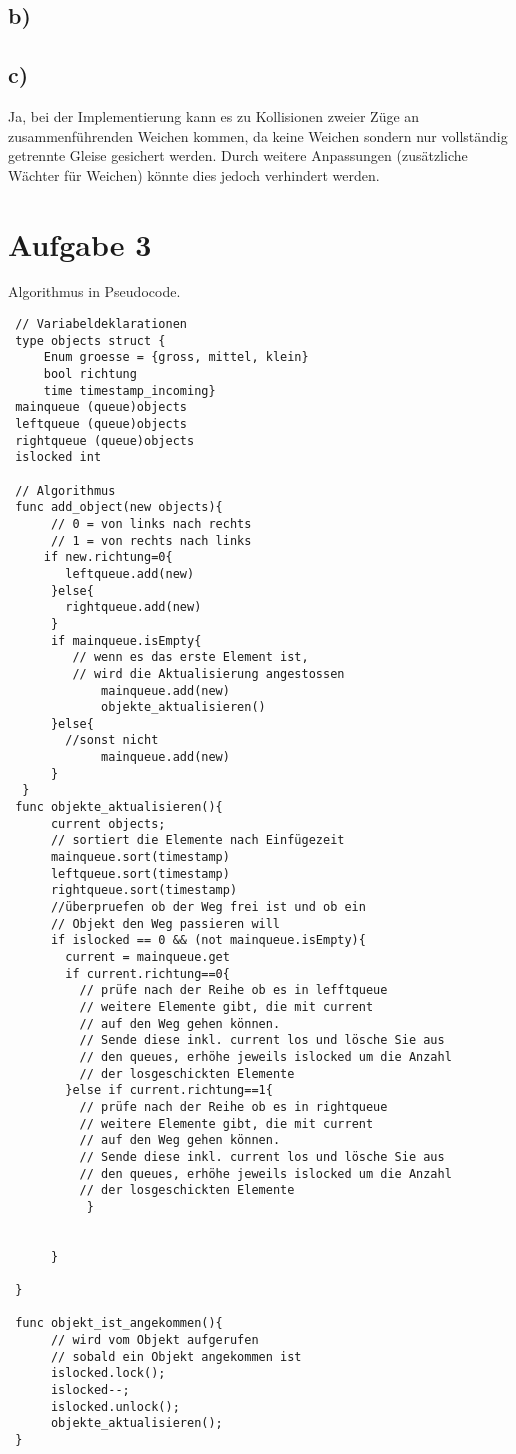 \documentclass[11pt,a4paper,DIV=10,]{scrartcl}
\begin{document}
\subsection*{b)}

\subsection*{c)}
Ja, bei der Implementierung kann es zu Kollisionen zweier Züge an zusammenführenden Weichen kommen, da keine Weichen sondern nur vollständig getrennte Gleise gesichert werden. Durch weitere Anpassungen (zusätzliche Wächter für Weichen) könnte dies jedoch verhindert werden. 

\section*{Aufgabe 3}
Algorithmus in Pseudocode.
\begin{lstlisting}
 // Variabeldeklarationen
 type objects struct {
     Enum groesse = {gross, mittel, klein}
     bool richtung
     time timestamp_incoming}
 mainqueue (queue)objects
 leftqueue (queue)objects
 rightqueue (queue)objects
 islocked int
 
 // Algorithmus
 func add_object(new objects){
      // 0 = von links nach rechts
      // 1 = von rechts nach links 
     if new.richtung=0{
	    leftqueue.add(new)
      }else{
	    rightqueue.add(new)
      }
      if mainqueue.isEmpty{
	     // wenn es das erste Element ist,
	     // wird die Aktualisierung angestossen
             mainqueue.add(new)
             objekte_aktualisieren()
      }else{
	    //sonst nicht
             mainqueue.add(new)
      }
  }
 func objekte_aktualisieren(){
      current objects;
      // sortiert die Elemente nach Einfügezeit
      mainqueue.sort(timestamp)
      leftqueue.sort(timestamp)
      rightqueue.sort(timestamp)
      //überpruefen ob der Weg frei ist und ob ein 
      // Objekt den Weg passieren will
      if islocked == 0 && (not mainqueue.isEmpty){
	    current = mainqueue.get
	    if current.richtung==0{
		  // prüfe nach der Reihe ob es in lefftqueue 
		  // weitere Elemente gibt, die mit current
		  // auf den Weg gehen können. 
		  // Sende diese inkl. current los und lösche Sie aus 
		  // den queues, erhöhe jeweils islocked um die Anzahl
		  // der losgeschickten Elemente
	    }else if current.richtung==1{
		  // prüfe nach der Reihe ob es in rightqueue 
		  // weitere Elemente gibt, die mit current
		  // auf den Weg gehen können. 
		  // Sende diese inkl. current los und lösche Sie aus 
		  // den queues, erhöhe jeweils islocked um die Anzahl
		  // der losgeschickten Elemente
           }
	    
	    
      }
 
 }
 
 func objekt_ist_angekommen(){
      // wird vom Objekt aufgerufen
      // sobald ein Objekt angekommen ist
      islocked.lock();
      islocked--;
      islocked.unlock();
      objekte_aktualisieren();
 }
      
 
\end{lstlisting}
\end{document}
